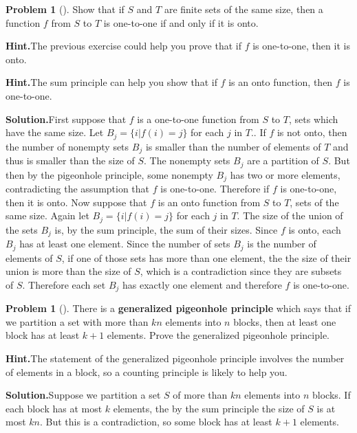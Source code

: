 \documentclass[10pt,]{book}
\newcommand{\terminology}[1]{\textbf{#1}}
\theoremstyle{plain}
\theoremstyle{definition}
\newtheorem{activity}[project]{Problem}
\theoremstyle{definition}
\numberwithin{equation}{chapter}
\begin{document}
\begin{activity}[]\label{activity-62}
Show that if \(S\) and \(T\) are finite sets of the same size, then a function \(f\) from \(S\) to \(T\) is one-to-one if and only if it is onto.%
\par\medskip\noindent%
\textbf{Hint.}\quad The previous exercise could help you prove that if \(f\) is one-to-one, then it is onto.%
\par\medskip\noindent%
\textbf{Hint.}\quad The sum principle can help you show that if \(f\) is an onto function, then \(f\) is one-to-one.%
\par\medskip\noindent%
\textbf{Solution.}\quad First suppose that \(f\) is a one-to-one function from \(S\) to \(T\), sets which have the same size. Let \(B_j=\{i|f(i)=j\}\) for each \(j\) in \(T\)..  If \(f\) is not onto, then the number of nonempty sets \(B_j\) is smaller than the number of elements of \(T\) and thus is smaller than the size of \(S\). The nonempty sets \(B_j\) are a partition of \(S\). But then by the pigeonhole principle, some nonempty \(B_j\) has two or more elements, contradicting the assumption that \(f\) is one-to-one. Therefore if \(f\) is one-to-one, then it is onto. Now suppose that \(f\) is an onto function from \(S\) to \(T\), sets of the same size. Again let \(B_j =\{i|f(i)=j\}\) for each \(j\) in \(T\). The size of the union of the sets \(B_j\) is, by the sum principle, the sum of their sizes. Since \(f\) is onto, each \(B_j\) has at least one element. Since the number of sets \(B_j\) is the number of elements of \(S\), if one of those sets has more than one element, the the size of their union is more than the size of \(S\), which is a contradiction since they are subsets of \(S\). Therefore each set \(B_j\) has exactly one element and therefore \(f\) is one-to-one.%
\end{activity}
\begin{activity}[]\label{activity-63}
There is a \terminology{generalized pigeonhole principle} which says that if we partition a set with more than \(kn\) elements into \(n\) blocks, then at least one block has at least \(k+1\) elements. Prove the generalized pigeonhole principle.%
\par\medskip\noindent%
\textbf{Hint.}\quad The statement of the generalized pigeonhole principle involves the number of elements in a block, so a counting principle is likely to help you.%
\par\medskip\noindent%
\textbf{Solution.}\quad Suppose we partition a set \(S\) of more than \(kn\) elements into \(n\) blocks. If each block has at most \(k\) elements, the by the sum principle the size of \(S\) is at most \(kn\). But this is a contradiction, so some block has at least \(k+1\) elements.%
\end{activity}
\end{document}
